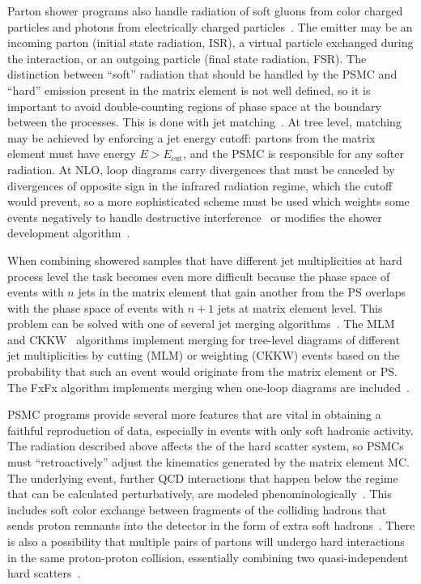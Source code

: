 Parton shower programs also handle radiation of soft gluons from color charged particles and photons from electrically charged particles~\cite{Sjostrand:2004ef}.
The emitter may be an incoming parton (initial state radiation, ISR), a virtual particle exchanged during the interaction, or an outgoing particle (final state radiation, FSR).
The distinction between ``soft'' radiation that should be handled by the PSMC and ``hard'' emission present in the matrix element is not well defined, so it is important to avoid double-counting regions of phase space at the boundary between the processes.
This is done with jet matching~\cite{Alwall:2014hca,Olive:2016xmw}.
At tree level, matching may be achieved by enforcing a jet energy cutoff: partons from the matrix element must have energy $E > E_\text{cut}$, and the PSMC is responsible for any softer radiation.
At NLO, loop diagrams carry divergences that must be canceled by divergences of opposite sign in the infrared radiation regime, which the cutoff would prevent, so a more sophisticated scheme must be used which weights some events negatively to handle destructive interference~\cite{Alwall:2014hca} or modifies the shower development algorithm~\cite{Nason:2004rx,Frixione:2007vw}.

When combining showered samples that have different jet multiplicities at hard process level the task becomes even more difficult because the phase space of events with $n$ jets in the matrix element that gain another from the PS overlaps with the phase space of events with $n+1$ jets at matrix element level.
This problem can be solved with one of several jet merging algorithms~\cite{Alwall:2007fs,Alwall:2008qv,Alwall:2014hca,Rauch:2016pai}.
The MLM~\cite{Mangano:2006rw} and CKKW~\cite{Catani:2001cc} algorithms implement merging for tree-level diagrams of different jet multiplicities by cutting (MLM) or weighting (CKKW) events based on the probability that such an event would originate from the matrix element or PS\@.
The FxFx algorithm implements merging when one-loop diagrams are included~\cite{Frederix:2012ps}.

PSMC programs provide several more features that are vital in obtaining a faithful reproduction of data, especially in events with only soft hadronic activity.
The radiation described above affects the {\pt} of the hard scatter system, so PSMCs must ``retroactively'' adjust the kinematics generated by the matrix element MC\@.
The underlying event, further QCD interactions that happen below the regime that can be calculated perturbatively, are modeled phenominologically~\cite{Olive:2016xmw,Sjostrand:2014zea}.
This includes soft color exchange between fragments of the colliding hadrons that sends proton remnants into the detector in the form of extra soft hadrons~\cite{Sjostrand:2004pf}.
There is also a possibility that multiple pairs of partons will undergo hard interactions in the same proton-proton collision, essentially combining two quasi-independent hard scatters~\cite{Sjostrand:2004ef,Manohar:2012jr}.


